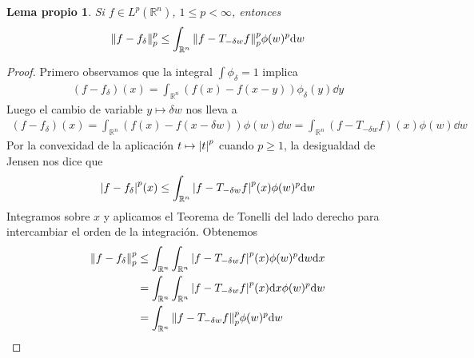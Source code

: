 \documentclass{article}
\newcommand{\realNumbers}{\mathbb{R}}
\newtheorem{myLemma}{Lema propio}
\theoremstyle{remark}
\begin{document}
  \begin{myLemma}
    \label{myLemma:convolutionDominationByTranslation}
    Si \(f \in L^p(\realNumbers^n)\), \(1 \leq p < \infty\), entonces 
    \begin{align}
      \norm{f - f_{\delta}}_p^p 
      \leq 
      \int_{\realNumbers^n} \norm{f - T_{- \delta w} f}_p^p \phi(w)^p \dd w
    \end{align}
  \end{myLemma}
  \begin{proof}
    Primero observamos que la integral \(\int \phi_{\delta} = 1\) implica
    \begin{align}
      (f - f_{\delta}) (x)
      =
      \int_{\realNumbers^n} (f(x) - f(x - y)) \phi_{\delta}(y) \dd y
    \end{align}
    Luego el cambio de variable \(y \mapsto \delta w\) nos lleva a
    \begin{align}
      (f - f_{\delta}) (x)
      =
      \int_{\realNumbers^n} (f(x) - f(x - \delta w)) \phi(w) \dd w
      =
      \int_{\realNumbers^n} (f - T_ {- \delta w} f) (x) \phi(w) \dd w
    \end{align}
    Por la convexidad de la aplicación \(t \mapsto \abs{t}^p\) cuando \(p \geq 1\), la desigualdad de Jensen nos dice que
    \begin{align}
      \abs{f - f_{\delta}}^p (x)
      \leq
      \int_{\realNumbers^n} \abs{f - T_{- \delta w} f}^p (x) \phi(w)^p \dd w
    \end{align}
    Integramos sobre \(x\) y aplicamos el Teorema de Tonelli del lado derecho para intercambiar el orden de la integración.
    Obtenemos
    \begin{align}
      \norm{f - f_{\delta}}_p^p
      &\leq
      \int_{\realNumbers^n} 
        \int_{\realNumbers^n} 
          \abs{f - T_{- \delta w} f}^p (x) \phi(w)^p 
        \dd w
      \dd x
      \\
      &=
      \int_{\realNumbers^n}
        \int_{\realNumbers^n}
          \abs{f - T_{- \delta w} f}^p (x)
        \dd x 
        \phi(w)^p 
      \dd w
      \\
      &=
      \int_{\realNumbers^n}
        \norm{f - T_{- \delta w} f}_p^p 
        \phi(w)^p 
      \dd w
    \end{align}
  \end{proof}
\end{document}
